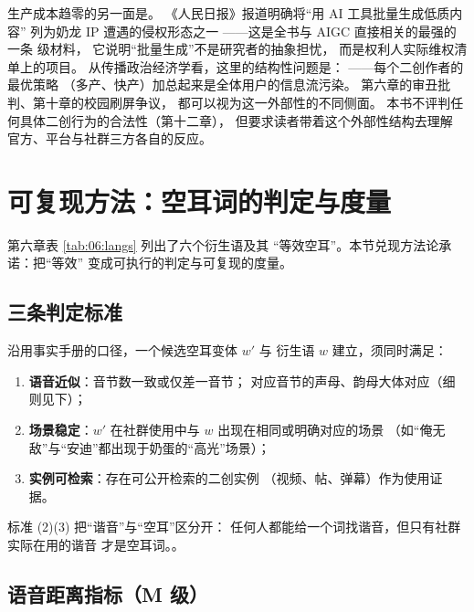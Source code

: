 \begin{nlcritique}
  生产成本趋零的另一面是。
  《人民日报》报道明确将“用 AI 工具批量生成低质内容”
  列为奶龙 IP 遭遇的侵权形态之一
  \cite{jiang2026nailong}——这是全书与
  AIGC 直接相关的最强的一条  级材料，
  它说明“批量生成”不是研究者的抽象担忧，
  而是权利人实际维权清单上的项目。
  从传播政治经济学看，这里的结构性问题是：
  ——每个二创作者的最优策略
  （多产、快产）加总起来是全体用户的信息流污染。
  第六章的审丑批判、第十章的校园刷屏争议，
  都可以视为这一外部性的不同侧面。
  本书不评判任何具体二创行为的合法性（第十二章），
  但要求读者带着这个外部性结构去理解
  官方、平台与社群三方各自的反应。
\end{nlcritique}

\section{可复现方法：空耳词的判定与度量}\label{sec:08:soramimi}

第六章表 \ref{tab:06:langs} 列出了六个衍生语及其
“等效空耳”。本节兑现方法论承诺：把“等效”
变成可执行的判定与可复现的度量。

\subsection{三条判定标准}

沿用事实手册的口径，一个候选空耳变体 $w'$ 与
衍生语 $w$ 建立，须同时满足：

\begin{enumerate}[label=(\arabic*),leftmargin=2.4em]
  \item \textbf{语音近似}：音节数一致或仅差一音节；
        对应音节的声母、韵母大体对应（细则见下）；
  \item \textbf{场景稳定}：$w'$ 在社群使用中与 $w$
        出现在相同或明确对应的场景
        （如“俺无敌”与“安迪”都出现于奶蛋的“高光”场景）；
  \item \textbf{实例可检索}：存在可公开检索的二创实例
        （视频、帖、弹幕）作为使用证据。
\end{enumerate}

标准 (2)(3) 把“谐音”与“空耳”区分开：
任何人都能给一个词找谐音，但只有社群实际在用的谐音
才是空耳词。。

\subsection{语音距离指标（M 级）}

